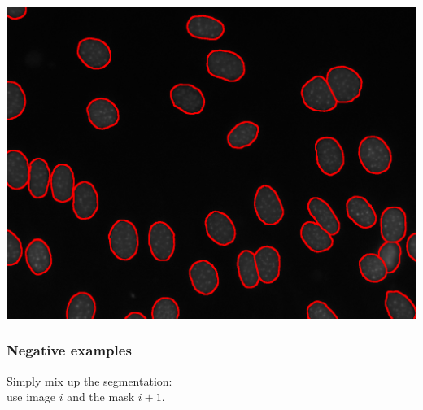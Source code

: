 \documentclass{beamer}
\begin{document}
\begin{frame}[fragile]

\centering
\includegraphics[width=.8\textwidth]{dna}

\end{frame}

\begin{frame}[fragile]
\frametitle{Negative examples}

Simply mix up the segmentation:\\
use image $i$ and the mask $i+1$.
\end{frame}
\end{document}
